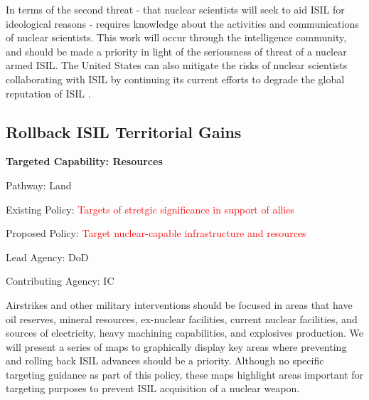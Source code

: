 \documentclass{report}
\begin{document}
In terms of the second threat - that nuclear scientists will seek to aid ISIL for ideological reasons - requires knowledge about the activities and communications of nuclear scientists. This work will occur through the intelligence community, and should be made a priority in light of the seriousness of threat of a nuclear armed ISIL. The United States can also mitigate the risks of nuclear scientists collaborating with ISIL by continuing its current efforts to degrade the global reputation of ISIL \cite{Gearan2014}.




\subsection{Rollback ISIL Territorial Gains}




\bfseries Targeted Capability: Resources 

Pathway: Land



Existing Policy: \textcolor{red}{Targets of stretgic significance in support of allies}



Proposed Policy: \textcolor{red}{Target nuclear-capable infrastructure and resources}

Lead Agency: DoD

Contributing Agency: IC \normalfont

Airstrikes and other military interventions should be focused in areas that have oil reserves, mineral resources, ex-nuclear facilities, current nuclear facilities, and sources of electricity, heavy machining capabilities, and explosives production. We will present a series of maps to graphically display key areas where preventing and rolling back ISIL advances should be a priority. Although no specific targeting guidance as part of this policy, these maps highlight areas important for targeting purposes to prevent ISIL acquisition of a nuclear weapon.
\end{document}
